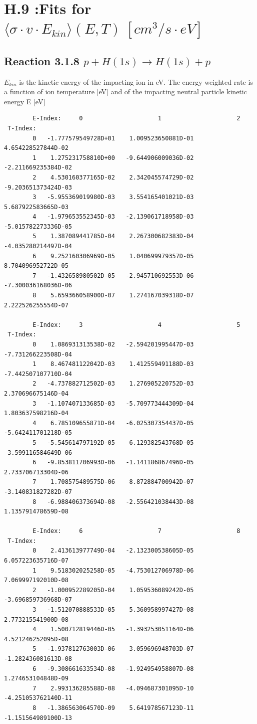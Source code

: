 \documentclass[12pt,dvips]{article}
\begin{document}
\section{H.9 :Fits for $\langle\sigma \cdot v \cdot E_{kin} \rangle (E,T) \ [cm^3/s
\cdot eV]$}

\subsection{
Reaction 3.1.8   $p + H(1s)  \rightarrow  H(1s) + p $
}
$E_{kin}$ is the kinetic energy of the impacting ion in eV.
The energy weighted rate is a function of ion temperature
[eV]  and of the impacting neutral particle kinetic energy E [eV]

\begin{small}\begin{verbatim}
        E-Index:     0                     1                     2
 T-Index:
        0   -1.777579549728D+01    1.009523650881D-01    4.654228527844D-02
        1    1.275231758810D+00   -9.644906009036D-02   -2.211669235384D-02
        2    4.530160377165D-02    2.342045574729D-02   -9.203651373424D-03
        3   -5.955369019980D-03    3.554165401021D-03    5.687922583665D-03
        4   -1.979653552345D-03   -2.139061718958D-03   -5.015782273336D-05
        5    1.387089441785D-04    2.267300682383D-04   -4.035280214497D-04
        6    9.252160306969D-05    1.040699979357D-05    8.704096952722D-05
        7   -1.432658980502D-05   -2.945710692553D-06   -7.300036168036D-06
        8    5.659366058900D-07    1.274167039318D-07    2.222526255554D-07

        E-Index:     3                     4                     5
 T-Index:
        0    1.086931313538D-02   -2.594201995447D-03   -7.731266223508D-04
        1    8.467481122042D-03    1.412559491188D-03   -7.442507107710D-04
        2   -4.737882712502D-03    1.276905220752D-03    2.370696675146D-04
        3   -1.107407133685D-03   -5.709773444309D-04    1.803637598216D-04
        4    6.785109655871D-04   -6.025307354437D-05   -5.642411701218D-05
        5   -5.545614797192D-05    6.129382543768D-05   -3.599116584649D-06
        6   -9.853811706993D-06   -1.141186867496D-05    2.733706713304D-06
        7    1.708575489575D-06    8.872884700942D-07   -3.140831827282D-07
        8   -6.988406373694D-08   -2.556421038443D-08    1.135791478659D-08

        E-Index:     6                     7                     8
 T-Index:
        0    2.413613977749D-04   -2.132300538605D-05    6.057223635716D-07
        1    9.518302025258D-05   -4.753012706978D-06    7.069997192010D-08
        2   -1.000952289205D-04    1.059536089242D-05   -3.696859736968D-07
        3   -1.512070888533D-05    5.360958997427D-08    2.773215541900D-08
        4    1.500712819446D-05   -1.393253051164D-06    4.521246252095D-08
        5   -1.937812763003D-06    3.059696948703D-07   -1.282436081613D-08
        6   -9.308661633534D-08   -1.924954958807D-08    1.274653104848D-09
        7    2.993136285588D-08   -4.094687301095D-10   -4.251053762140D-11
        8   -1.386563064570D-09    5.641978567123D-11   -1.151564989100D-13


\end{verbatim}
\end{small}
\end{document}
